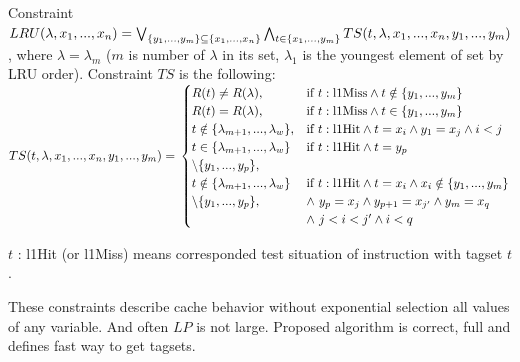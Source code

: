 \documentclass[times, 10pt,twocolumn]{article}
\begin{document}
Constraint $LRU(\lambda, x_1, ..., x_n) = \bigvee_{\{y_1, ..., y_m\} \subseteq \{x_1, ..., x_n\}} \bigwedge_{t \in \{x_1, ..., y_m\}}  TS(t, \lambda, x_1, ..., x_n,\\y_1, ..., y_m)$, where $\lambda = \lambda_m$ ($m$ is number of $\lambda$ in its set, $\lambda_1$ is the youngest element of set by LRU order). Constraint $TS$ is the following:\\
$TS(t, \lambda, x_1, ..., x_n, y_1, ..., y_m) = \\
\begin{cases}
R(t) \neq R(\lambda),&\text{if~} t:\text{l1Miss} \wedge t \notin \{y_1, ..., y_m\}\\
R(t) = R(\lambda),&\text{if~} t:\text{l1Miss} \wedge t \in \{y_1, ..., y_m\}\\
t \notin \{\lambda_{m+1}, ..., \lambda_w\},&\text{if~} t:\text{l1Hit} \wedge t = x_i \wedge y_1 = x_j \wedge i < j\\
t \in \{\lambda_{m+1}, ..., \lambda_w\}&\text{if~} t:\text{l1Hit} \wedge t = y_p\\ \setminus\{y_1, ..., y_p\},\\
t \notin \{\lambda_{m+1}, ..., \lambda_w\}&\text{if~} t:\text{l1Hit} \wedge t = x_i \wedge x_i \notin \{y_1, ..., y_m\}\\ \setminus\{y_1, ..., y_p\},& \wedge~y_p = x_j \wedge y_{p+1} = x_{j'} \wedge y_m = x_q\\& \wedge~j < i < j' \wedge i < q \\
\end{cases}$

$t$ : l1Hit (or l1Miss) means corresponded test situation of instruction with tagset $t$.

These constraints describe cache behavior without exponential selection all values of any variable. And often $LP$ is not large. Proposed algorithm is correct, full and defines fast way to get tagsets.
\end{document}
